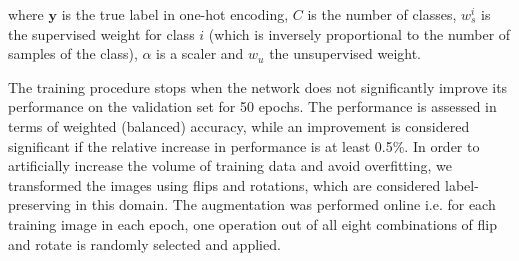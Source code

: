 \documentclass[journal]{IEEEtran}
\begin{document}
where $\mathbf{y}$ is the true label in one-hot encoding, $C$ is the number of classes, $w_s^{i}$ is the supervised weight for class $i$ (which is inversely proportional to the number of samples of the class), $\alpha$ is a scaler and $w_u$ the unsupervised weight.

The training procedure stops when the network does not significantly improve its performance on the validation set for 50 epochs. The performance is assessed in terms of weighted (balanced) accuracy, while an improvement is considered significant if the relative increase in performance is at least 0.5\%. In order to artificially increase the volume of training data and avoid overfitting, we transformed the images using flips and rotations, which are considered label-preserving in this domain. The augmentation was performed online i.e. for each training image in each epoch, one operation out of all eight combinations of flip and rotate is randomly selected and applied.
\end{document}
